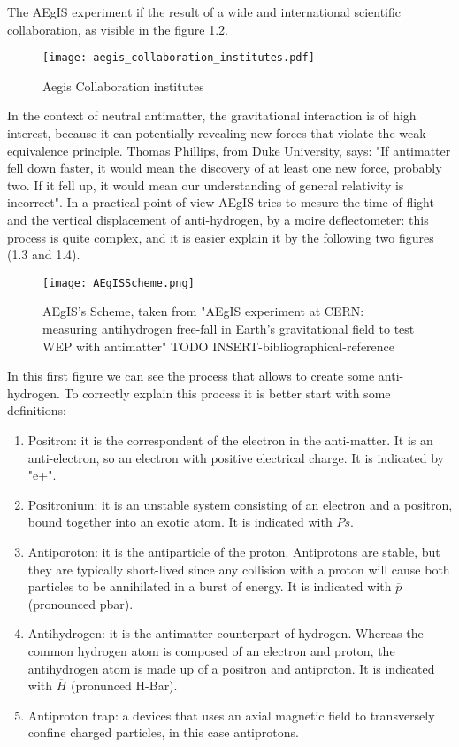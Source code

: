 The AEgIS experiment if the result of a wide and international scientific collaboration, as visible in the figure 1.2.

\begin{figure}[H]
\centering 
\texttt{[image: aegis\_collaboration\_institutes.pdf]} 
\caption{Aegis Collaboration institutes}
\end{figure}


In the context of neutral antimatter, the gravitational interaction is of high interest, because it can potentially revealing new forces that violate the weak equivalence principle. Thomas Phillips, from Duke University, says: "If antimatter fell down faster, it would mean the discovery of at least one new force, probably two. If it fell up, it would mean our understanding of general relativity is incorrect". In a practical point of view AEgIS tries to mesure the time of flight and the vertical displacement of anti-hydrogen, by a moire deflectometer: this process is quite complex, and it is easier explain it by the following two figures (1.3 and 1.4).

\begin{figure}[H]
\centering 
\texttt{[image: AEgISScheme.png]} 
\caption{AEgIS's Scheme, taken from "AEgIS experiment at CERN: measuring antihydrogen free-fall in Earth’s gravitational field to test WEP with antimatter" TODO INSERT-bibliographical-reference}
\end{figure}

In this first figure we can see the process that allows to create some anti-hydrogen. To correctly explain this process it is better start with some definitions:


\begin{enumerate}

\item Positron: it is the correspondent of the electron in the anti-matter. It is an anti-electron, so an electron with positive electrical charge. It is indicated by "e+".

\item Positronium: it is an unstable system consisting of an electron and a positron, bound together into an exotic atom. It is indicated with $ {Ps} $.

\item Antiporoton: it is the antiparticle of the proton. Antiprotons are stable, but they are typically short-lived since any collision with a proton will cause both particles to be annihilated in a burst of energy. It is indicated with $ \overline{p} $ (pronounced pbar).

\item Antihydrogen: it is the antimatter counterpart of hydrogen. Whereas the common hydrogen atom is composed of an electron and proton, the antihydrogen atom is made up of a positron and antiproton. It is indicated with $ \overline{H} $ (pronunced H-Bar).


\item Antiproton trap: a devices that uses an axial magnetic field to transversely confine charged particles, in this case antiprotons.


\end{enumerate}

